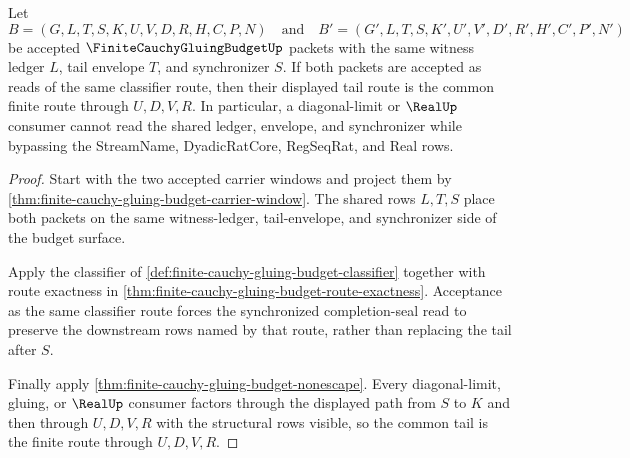 \begin{theorem}
\label{thm:finite-cauchy-gluing-budget-common-tail}
Let
$$
B=(G,L,T,S,K,U,V,D,R,H,C,P,N)
\quad\text{and}\quad
B'=(G',L,T,S,K',U',V',D',R',H',C',P',N')
$$
be accepted $\FiniteCauchyGluingBudgetUp$ packets with the same witness ledger $L$, tail envelope $T$, and synchronizer $S$. If both packets are accepted as reads of the same classifier route, then their displayed tail route is the common finite route through $U,D,V,R$. In particular, a diagonal-limit or $\RealUp$ consumer cannot read the shared ledger, envelope, and synchronizer while bypassing the StreamName, DyadicRatCore, RegSeqRat, and Real rows.
\end{theorem}
\begin{proof}
Start with the two accepted carrier windows and project them by \autoref{thm:finite-cauchy-gluing-budget-carrier-window}. The shared rows $L,T,S$ place both packets on the same witness-ledger, tail-envelope, and synchronizer side of the budget surface.

Apply the classifier of \autoref{def:finite-cauchy-gluing-budget-classifier} together with route exactness in \autoref{thm:finite-cauchy-gluing-budget-route-exactness}. Acceptance as the same classifier route forces the synchronized completion-seal read to preserve the downstream rows named by that route, rather than replacing the tail after $S$.

Finally apply \autoref{thm:finite-cauchy-gluing-budget-nonescape}. Every diagonal-limit, gluing, or $\RealUp$ consumer factors through the displayed path from $S$ to $K$ and then through $U,D,V,R$ with the structural rows visible, so the common tail is the finite route through $U,D,V,R$.
\end{proof}

